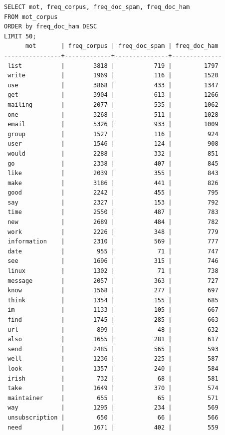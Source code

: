 \documentclass[a4paper,12pt]{article}
\begin{document}
	\begin{verbatim}
SELECT mot, freq_corpus, freq_doc_spam, freq_doc_ham 
FROM mot_corpus
ORDER by freq_doc_ham DESC
LIMIT 50;
      mot       | freq_corpus | freq_doc_spam | freq_doc_ham 
----------------+-------------+---------------+--------------
 list           |        3818 |           719 |         1797
 write          |        1969 |           116 |         1520
 use            |        3868 |           433 |         1347
 get            |        3904 |           613 |         1266
 mailing        |        2077 |           535 |         1062
 one            |        3268 |           511 |         1028
 email          |        5326 |           933 |         1009
 group          |        1527 |           116 |          924
 user           |        1546 |           124 |          908
 would          |        2288 |           332 |          851
 go             |        2338 |           407 |          845
 like           |        2039 |           355 |          843
 make           |        3186 |           441 |          826
 good           |        2242 |           455 |          795
 say            |        2327 |           153 |          792
 time           |        2550 |           487 |          783
 new            |        2689 |           484 |          782
 work           |        2226 |           348 |          779
 information    |        2310 |           569 |          777
 date           |         955 |            71 |          747
 see            |        1696 |           315 |          746
 linux          |        1302 |            71 |          738
 message        |        2057 |           363 |          727
 know           |        1568 |           277 |          697
 think          |        1354 |           155 |          685
 im             |        1133 |           105 |          667
 find           |        1745 |           285 |          663
 url            |         899 |            48 |          632
 also           |        1655 |           281 |          617
 send           |        2485 |           565 |          593
 well           |        1236 |           225 |          587
 look           |        1357 |           240 |          584
 irish          |         732 |            68 |          581
 take           |        1649 |           370 |          574
 maintainer     |         655 |            65 |          571
 way            |        1295 |           234 |          569
 unsubscription |         650 |            66 |          566
 need           |        1671 |           402 |          559

\end{verbatim}
\end{document}
